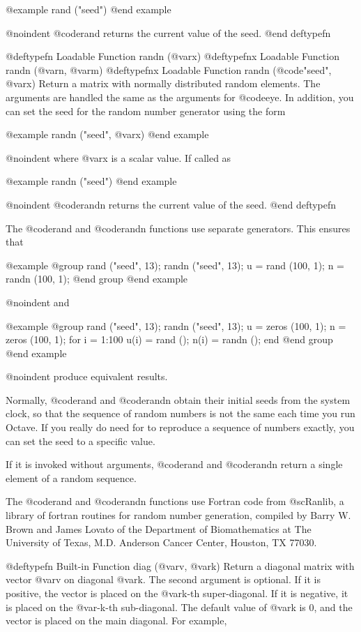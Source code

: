 @example
rand ("seed")
@end example

@noindent
@code{rand} returns the current value of the seed.
@end deftypefn

@deftypefn {Loadable Function} {} randn (@var{x})
@deftypefnx {Loadable Function} {} randn (@var{n}, @var{m})
@deftypefnx {Loadable Function} {} randn (@code{"seed"}, @var{x})
Return a matrix with normally distributed random elements.  The
arguments are handled the same as the arguments for @code{eye}.  In
addition, you can set the seed for the random number generator using the
form

@example
randn ("seed", @var{x})
@end example

@noindent
where @var{x} is a scalar value.  If called as

@example
randn ("seed")
@end example

@noindent
@code{randn} returns the current value of the seed.
@end deftypefn

The @code{rand} and @code{randn} functions use separate generators.
This ensures that

@example
@group
rand ("seed", 13);
randn ("seed", 13);
u = rand (100, 1);
n = randn (100, 1);
@end group
@end example

@noindent
and

@example
@group
rand ("seed", 13);
randn ("seed", 13);
u = zeros (100, 1);
n = zeros (100, 1);
for i = 1:100
  u(i) = rand ();
  n(i) = randn ();
end
@end group
@end example

@noindent
produce equivalent results.

Normally, @code{rand} and @code{randn} obtain their initial
seeds from the system clock, so that the sequence of random numbers is
not the same each time you run Octave.  If you really do need for to
reproduce a sequence of numbers exactly, you can set the seed to a
specific value.

If it is invoked without arguments, @code{rand} and @code{randn} return a
single element of a random sequence.

The @code{rand} and @code{randn} functions use Fortran code from
@sc{Ranlib}, a library of fortran routines for random number generation,
compiled by Barry W. Brown and James Lovato of the Department of
Biomathematics at The University of Texas, M.D. Anderson Cancer Center,
Houston, TX 77030.

@deftypefn {Built-in Function} {} diag (@var{v}, @var{k})
Return a diagonal matrix with vector @var{v} on diagonal @var{k}.  The
second argument is optional.  If it is positive, the vector is placed on
the @var{k}-th super-diagonal.  If it is negative, it is placed on the
@var{-k}-th sub-diagonal.  The default value of @var{k} is 0, and the
vector is placed on the main diagonal.  For example,

